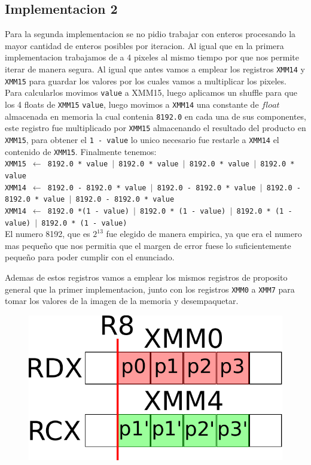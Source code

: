 \subsection{Implementacion 2}
Para la segunda implementacion se no pidio trabajar con enteros procesando la mayor cantidad de enteros posibles por iteracion. Al igual que en la primera implementacion trabajamos de a 4 pixeles al mismo tiempo por que nos permite iterar de manera segura. Al igual que antes vamos a emplear los registros \texttt{XMM14} y \texttt{XMM15} para guardar los valores por los cuales vamos a multiplicar los pixeles. Para calcularlos movimos \texttt{value} a XMM15, luego aplicamos un shuffle para que los 4 floats de \texttt{XMM15} \texttt{value}, luego movimos a \texttt{XMM14} una constante de $float$ almacenada en memoria la cual contenia \texttt{8192.0} en cada una de sus componentes, este registro fue multiplicado por \texttt{XMM15} almacenando el resultado del producto en \texttt{XMM15}, para obtener el \texttt{1 - value} lo unico necesario fue restarle a \texttt{XMM14} el contenido de \texttt{XMM15}. Finalmente tenemos:\\

\noindent
\texttt{XMM15 $\gets$ 8192.0 * value $\vert$ 8192.0 * value $\vert$ 8192.0 * value $\vert$ 8192.0 * value}\\
\texttt{XMM14 $\gets$ 8192.0 - 8192.0 * value $\vert$ 8192.0 - 8192.0 * value $\vert$ 8192.0 - 8192.0 * value $\vert$ 8192.0 - 8192.0 * value}\\
\texttt{XMM14 $\gets$ 8192.0 *(1 - value) $\vert$ 8192.0 * (1 - value) $\vert$ 8192.0 * (1 - value) $\vert$ 8192.0 * (1 - value)}\\

El numero 8192, que es $2^{13}$ fue elegido de manera empirica, ya que era el numero mas pequeño que nos permitia que el margen de error fuese lo suficientemente pequeño para poder cumplir con el enunciado.

Ademas de estos registros vamos a emplear los mismos registros de proposito general que la primer implementacion, junto con los registros \texttt{XMM0} a \texttt{XMM7} para tomar los valores de la imagen de la memoria y desempaquetar.

\begin{figure}[h!]
	\centering
	\includegraphics[scale=0.5]{images/MergeASM2_0}
\end{figure}

